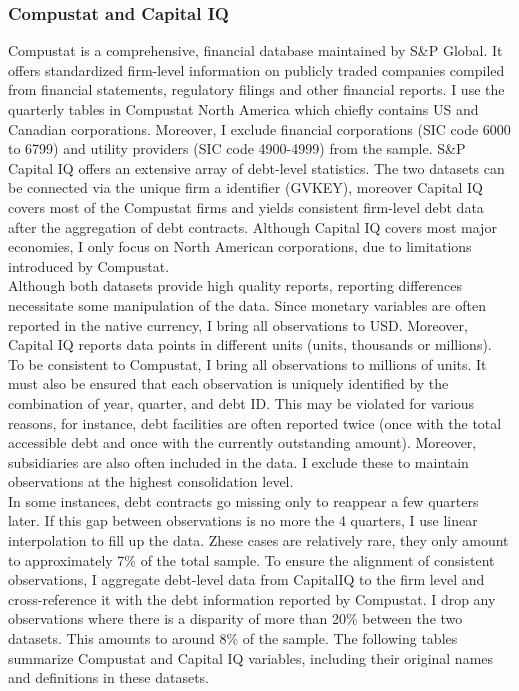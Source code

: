 \documentclass[12pt]{article}
\begin{document}
\subsubsection{Compustat and Capital IQ}
Compustat is a comprehensive, financial database maintained by S\&P Global. It offers standardized firm-level information on publicly traded companies compiled from financial statements, regulatory filings and other financial reports. I use the quarterly tables in Compustat North America which chiefly contains US and Canadian corporations. Moreover, I exclude financial corporations (SIC code 6000 to 6799) and utility providers (SIC code 4900-4999) from the sample. S\&P Capital IQ offers an extensive array of debt-level statistics. The two datasets can be connected via the unique firm a identifier (GVKEY), moreover Capital IQ covers most of the Compustat firms and yields consistent firm-level debt data after the aggregation of debt contracts. Although Capital IQ covers most major economies, I only focus on North American corporations, due to limitations introduced by Compustat.  \vspace{3mm} \\
Although both datasets provide high quality reports, reporting differences necessitate some manipulation of the data. Since monetary variables are often reported in the native currency, I bring all observations to USD. Moreover, Capital IQ reports data points in different units (units, thousands or millions). To be consistent to Compustat, I bring all observations to millions of units. It must also be ensured that each observation is uniquely identified by the combination of year, quarter, and debt ID. This may be violated for various reasons, for instance, debt facilities are often reported twice (once with the total accessible debt and once with the currently outstanding amount). Moreover, subsidiaries are also often included in the data. I exclude these to maintain observations at the highest consolidation level. \vspace{3mm} \\
In some instances, debt contracts go missing only to reappear a few quarters later. If this gap between observations is no more the 4 quarters, I use linear interpolation to fill up the data. Zhese cases are relatively rare, they only amount to approximately 7\% of the total sample. To ensure the alignment of consistent observations, I aggregate debt-level data from CapitalIQ to the firm level and cross-reference it with the debt information reported by Compustat. I drop any observations where there is a disparity of more than 20\% between the two datasets. This amounts to around 8\% of the sample. The following tables summarize Compustat and Capital IQ variables, including their original names and definitions in these datasets.
\end{document}
